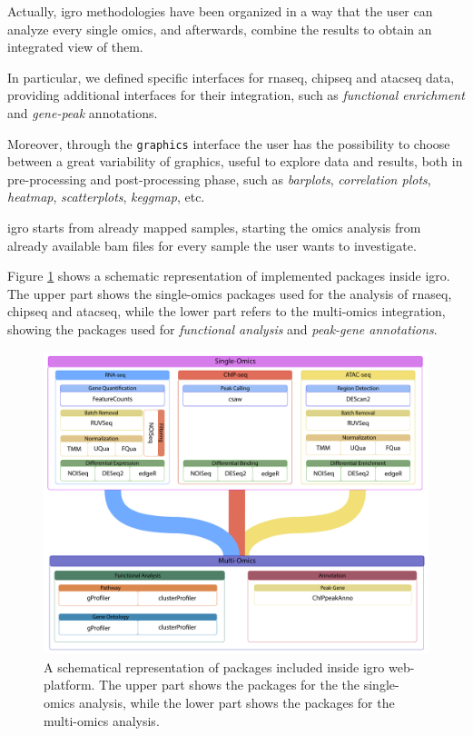 Actually, \gls{igro} methodologies have been organized in a way that the user can analyze every single omics, and afterwards, combine the results to obtain an integrated view of them.

In particular, we defined specific interfaces for \gls{rnaseq}, \gls{chipseq} and \gls{atacseq} data, providing additional interfaces for their integration, such as \textit{functional enrichment} and \textit{gene-peak} annotations.

Moreover, through the \lstinline!graphics! interface the user has the possibility to choose between a great variability of graphics, useful to explore data and results, both in pre-processing and post-processing phase, such as \textit{barplots}, \textit{correlation plots}, \textit{heatmap}, \textit{scatterplots}, \textit{keggmap}, etc.

\Gls{igro} starts from already mapped samples, starting the omics analysis from already available \gls{bam} files for every sample the user wants to investigate.

Figure \ref{fig:integrhopackscheme} shows a schematic representation of implemented packages inside \gls{igro}.
The upper part shows the single-omics packages used for the analysis of \gls{rnaseq}, \gls{chipseq} and \gls{atacseq}, while the lower part refers to the multi-omics integration, showing the packages used for \textit{functional analysis} and \textit{peak-gene annotations}.

\begin{figure}[ht]
\centering
\includegraphics[width=\textwidth, keepaspectratio]{img/integrho/integrho_pack_scheme.pdf}
\caption[\gls{igro} packages scheme]{A schematical representation of packages included inside \gls{igro} web-platform.
The upper part shows the packages for the the single-omics analysis, while the lower part shows the packages for the multi-omics analysis.}
\label{fig:integrhopackscheme}
\end{figure}

